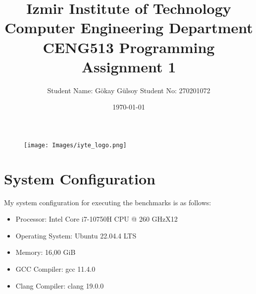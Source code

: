 \documentclass[16pt]{article}
\title{\bf{ Izmir Institute of Technology \\ Computer Engineering Department \\ CENG513 Programming Assignment 1}}
\author{Student Name: Gökay Gülsoy Student No: 270201072}
\date{\today}
\begin{document}
\pagecolor{myGray}
\pagestyle{fancy}
\renewcommand{\headrulewidth}{1pt}
\renewcommand{\footrulewidth}{1pt}
\renewcommand{\headruleskip}{2mm}
\renewcommand{\footruleskip}{2mm}

\setlength{\arrayrulewidth}{0.5mm}
\setlength{\tabcolsep}{8pt}
\renewcommand{\arraystretch}{1.5}

\fancyhead{} %
\fancyfoot{} %

\maketitle
\begin{figure}[H]
    \centering
    \texttt{[image: Images/iyte\_logo.png]}
\end{figure}

\newpage
\section*{System Configuration}
   My system configuration for executing the benchmarks is as follows:
    \begin{itemize}
        \item Processor: Intel Core i7-10750H CPU @ 260 GHzX12
        \item Operating System: Ubuntu 22.04.4 LTS
        \item Memory: 16,00 GiB  
        \item GCC Compiler: gcc 11.4.0
        \item Clang Compiler: clang 19.0.0
    \end{itemize}
    
\end{document}
